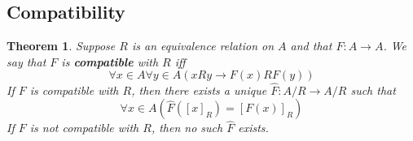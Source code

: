 \documentclass{report}
\newtheorem{theorem}[theo]{Theorem}
\begin{document}
\subsection{Compatibility}
\begin{theorem}
Suppose $R$ is an equivalence relation on $A$ and that $F:A\to A$. We say that $F$ is \textbf{compatible} with $R$ iff
\begin{equation*}
\forall x\in A\forall y\in A(xRy\to F(x)RF(y))
\end{equation*}
If $F$ is compatible with $R$, then there exists a unique $\hat F:A/R\to A/R$ such that
\begin{equation*}
\forall x\in A(\hat F([x]_R)=[F(x)]_R)
\end{equation*}
If $F$ is not compatible with $R$, then no such $\hat F$ exists.
\end{theorem}
\end{document}
